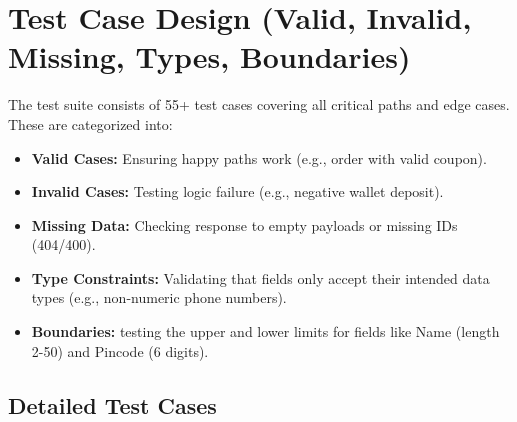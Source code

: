 \documentclass{article}
\begin{document}
\section{Test Case Design (Valid, Invalid, Missing, Types, Boundaries)}
The test suite consists of 55+ test cases covering all critical paths and edge cases. These are categorized into:
\begin{itemize}
    \item \textbf{Valid Cases:} Ensuring happy paths work (e.g., order with valid coupon).
    \item \textbf{Invalid Cases:} Testing logic failure (e.g., negative wallet deposit).
    \item \textbf{Missing Data:} Checking response to empty payloads or missing IDs (404/400).
    \item \textbf{Type Constraints:} Validating that fields only accept their intended data types (e.g., non-numeric phone numbers).
    \item \textbf{Boundaries:} testing the upper and lower limits for fields like Name (length 2-50) and Pincode (6 digits).
\end{itemize}

\subsection{Detailed Test Cases}
\end{document}
